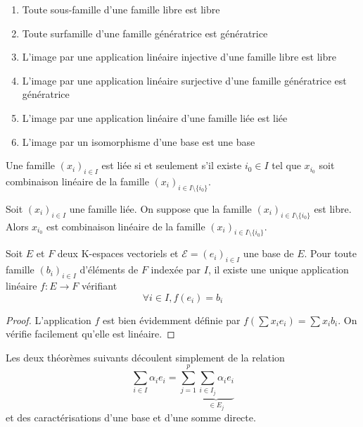 \begin{prop}
\begin{enumerate}
\item Toute sous-famille d'une famille libre est libre
\item Toute surfamille d'une famille génératrice est génératrice
\item L'image par une application linéaire injective d'une famille libre est libre
\item L'image par une application linéaire surjective d'une famille génératrice est génératrice
\item L'image par une application linéaire d'une famille liée est liée
\item L'image par un isomorphisme d'une base est une base
\end{enumerate}
\end{prop}

\begin{thm}
Une famille $(x_i)_{i\in I}$ est liée si et seulement s'il existe $i_0 \in I$ tel que $x_{i_0}$ soit combinaison linéaire de la famille $(x_i)_{i\in I\setminus\{i_0\}}$.
\end{thm}

\begin{thm}
Soit $(x_i)_{i\in I}$ une famille liée. On suppose que la famille $(x_i)_{i\in I\setminus\{i_0\}}$ est libre. Alors $x_{i_0}$ est combinaison linéaire de la famille $(x_i)_{i\in I\setminus\{i_0\}}$.
\end{thm}

\begin{thm}
Soit $E$ et $F$ deux K-espaces vectoriels et $\mathcal{E} = (e_i)_{i\in I}$ une base de $E$. Pour toute famille $(b_i)_{i\in I}$ d'éléments de $F$ indexée par $I$, il existe une unique application linéaire $f : E \to F$ vérifiant
\[ \forall i \in I, f(e_i) = b_i \]
\end{thm}

\begin{proof}
L'application $f$ est bien évidemment définie par $f(\sum x_i e_i) = \sum x_i b_i$. On vérifie facilement qu'elle est linéaire.
\end{proof}

\begin{rem}
Les deux théorèmes suivants découlent simplement de la relation
\[ \sum_{i\in I} \alpha_i e_i = \sum_{j=1}^p \underbrace{\sum_{i\in I_j} \alpha_i e_i}_{\in E_j} \]
et des caractérisations d'une base et d'une somme directe.
\end{rem}

